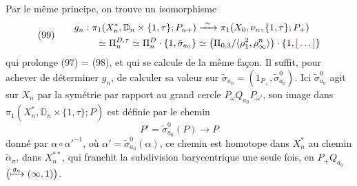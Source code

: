 \documentclass[11pt,a4paper]{article}
\begin{document}
Par le même principe, on trouve un isomorphisme
\[
  \text{(99)}\qquad
  \begin{aligned}
    g_n : \pi_1(X_n^*, \mathbb{D}_n \times \{1,\tau\} ; P_{n+}) &\xrightarrow{\ \sim\ } \pi_1(X_0, \nu_n, \{1,\tau\} ; P_+) \\
    \simeq \Pi_n^{D,\tau} \simeq \Pi_n^D \cdot \{1, \tilde\sigma_{a_0}\}
    &\simeq \bigl(\Pi_{0,3}/\langle \rho_1^2, \rho_\infty^n \rangle\bigr) \cdot \{1, \ill{}\}
  \end{aligned}
\]
qui prolonge (97) = (98), et qui se calcule de la même façon. Il suffit, pour achever de déterminer $g_n$, de calculer sa valeur sur \struck{\ill{}}
$\tilde\sigma_{a_0} = (1_{P_+}, \tilde\sigma_{a_0}^0)$. Ici $\tilde\sigma_{a_0}^0$ agit sur $X_n$ par la symétrie par rapport au grand cercle $P_\omega Q_{a_0} P_{\omega'}$,  son image dans $\pi_1(X_n^*, \mathbb{D}_n \times \{1,\tau\} ; P)$ est définie par le chemin \struck{\ill{}}
\[
  P' = \tilde\sigma_{a_0}^0(P) \longrightarrow P
\]
donné par $\alpha \circ \alpha'^{-1}$, où $\alpha' = \tilde\sigma_{a_0}^0(\alpha)$, ce chemin est homotope dans $X_n^*$ au chemin $\tilde\alpha_\sigma$,  dans $X_n^{**}$, qui franchit la subdivision barycentrique une seule fois, en $P_+ Q_{a_0}$ $\bigl(\xmapsto{g_n} (\infty,1)\bigr)$.
\end{document}
